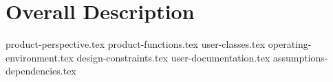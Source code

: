 \chapter{Overall Description} \label{chap:overall_description}

{product-perspective.tex}
{product-functions.tex}
{user-classes.tex}
{operating-environment.tex}
{design-constraints.tex}
{user-documentation.tex}
{assumptions-dependencies.tex}
